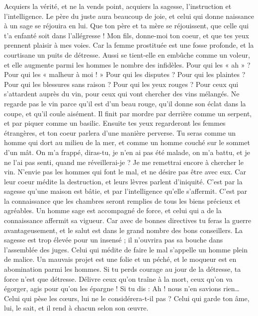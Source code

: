 \begin{multicols}{2}
Acquiers la vérité, et ne la vends point, acquiers la sagesse, l'instruction et l’intelligence.
Le père du juste aura beaucoup de joie, et celui qui donne naissance à un sage se réjouira en lui.
Que ton père et ta mère se réjouissent, que celle qui t'a enfanté soit dans l’allégresse !
Mon fils, donne-moi ton coeur, et que tes yeux prennent plaisir à mes voies.
Car la femme prostituée est une fosse profonde, et la courtisane un puits de détresse.
Aussi se tient-elle en embûche comme un voleur, et elle augmente parmi les hommes le nombre des infidèles.
Pour qui les « ah » ? Pour qui les « malheur à moi ! » Pour qui les disputes ? Pour qui les plaintes ? Pour qui les blessures sans raison ? Pour qui les yeux rouges ?
Pour ceux qui s'attardent auprès du vin, pour ceux qui vont chercher des vins mélangés.
Ne regarde pas le vin parce qu’il est d’un beau rouge, qu’il donne son éclat dans la coupe, et qu'il coule aisément.
Il finit par mordre par derrière comme un serpent, et par piquer comme un basilic.
Ensuite tes yeux regarderont les femmes étrangères, et ton coeur parlera d’une manière perverse.
Tu seras comme un homme qui dort au milieu de la mer, et comme un homme couché sur le sommet d’un mât.
On m'a frappé, diras-tu, je n'en ai pas été malade, on m'a battu, et je ne l'ai pas senti, quand me réveillerai-je ? Je me remettrai encore à chercher le vin.
\VerseOne{}N'envie pas les hommes qui font le mal, et ne désire pas être avec eux.
Car leur coeur médite la destruction, et leurs lèvres parlent d’iniquité.
C’est par la sagesse qu’une maison est bâtie, et par l'intelligence qu’elle s’affermit.
C’est par la connaissance que les chambres seront remplies de tous les biens précieux et agréables.
Un homme sage est accompagné de force, et celui qui a de la connaissance affermit sa vigueur.
Car avec de bonnes directives tu feras la guerre avantageusement, et le salut est dans le grand nombre des bons conseillers.
La sagesse est trop élevée pour un insensé ; il n'ouvrira pas sa bouche dans l’assemblée des juges.
Celui qui médite de faire le mal s’appelle un homme plein de malice.
Un mauvais projet est une folie et un péché, et le moqueur est en abomination parmi les hommes.
Si tu perds courage au jour de la détresse, ta force n'est que détresse.
Délivre ceux qu’on traîne à la mort, ceux qu’on va égorger, agis pour qu’on les épargne !
Si tu dis : Ah ! nous n’en savions rien… Celui qui pèse les cœurs, lui ne le considérera-t-il pas ? Celui qui garde ton âme, lui, le sait, et il rend à chacun selon son œuvre.

\end{multicols}
